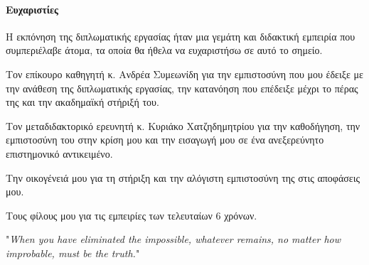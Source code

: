 {	\newpage
	\paragraph{Ευχαριστίες}
	Η εκπόνηση της διπλωματικής εργασίας ήταν μια γεμάτη και διδακτική εμπειρία που συμπεριέλαβε άτομα, τα οποία θα ήθελα να ευχαριστήσω σε αυτό το σημείο.
	
	Τον επίκουρο καθηγητή κ. Ανδρέα Συμεωνίδη για την εμπιστοσύνη  που μου έδειξε με την ανάθεση της διπλωματικής εργασίας, την κατανόηση που επέδειξε μέχρι το πέρας της και την ακαδημαϊκή στήριξή του.
	
	Τον μεταδιδακτορικό ερευνητή κ. Κυριάκο Χατζηδημητρίου για την καθοδήγηση, την εμπιστοσύνη του στην κρίση μου και την εισαγωγή μου σε ένα ανεξερεύνητο επιστημονικό αντικειμένο.
	
	Την οικογένειά μου για τη στήριξη και την αλόγιστη εμπιστοσύνη της στις αποφάσεις μου.
	
	Τους φίλους μου για τις εμπειρίες των τελευταίων 6 χρόνων.
	\newpage
}


\tableofcontents
\listoffigures
\listoftables

\pagebreak
\thispagestyle{empty}
\hspace{0pt}
\vfill
\begin{flushright}
"\textit{When you have eliminated the impossible, whatever remains, no matter how improbable, must be the truth.}"
\\[8pt]
\end{flushright}
\vfill
\hspace{0pt}
\pagebreak




